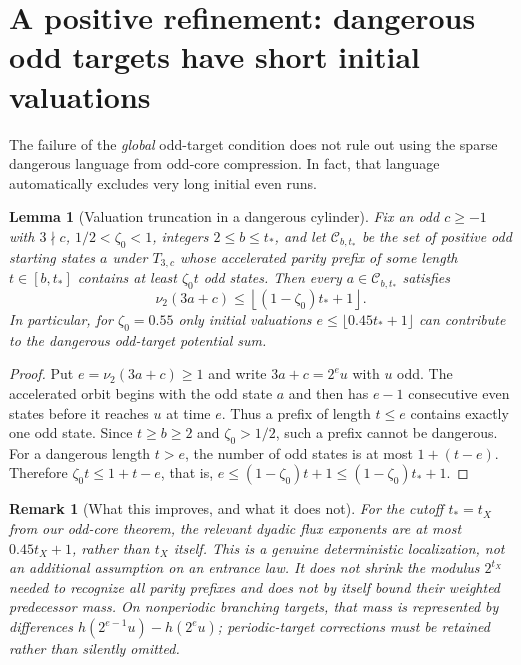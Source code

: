 \documentclass[11pt,a4paper]{article}
\newtheorem{lemma}[theorem]{Lemma}
\newtheorem{remark}[theorem]{Remark}
\begin{document}
\section{A positive refinement: dangerous odd targets have short initial valuations}
The failure of the \emph{global} odd-target condition does not rule out
using the sparse dangerous language from odd-core compression.  In
fact, that language automatically excludes very long initial
even runs.
\begin{lemma}[Valuation truncation in a dangerous cylinder]\label{lem:valuation}
Fix an odd $c\ge-1$ with $3\nmid c$, $1/2<\zeta_0<1$,
integers $2\le b\le t_*$, and let
$\mathcal C_{b,t_*}$ be the set of positive odd starting states $a$
under $T_{3,c}$ whose accelerated parity prefix of some length $t\in[b,t_*]$
contains at least $\zeta_0t$ odd states.  Then every
$a\in\mathcal C_{b,t_*}$ satisfies
\begin{equation}\label{eq:valuationcut}
 \boxed{\nu_2(3a+c)\le\left\lfloor(1-\zeta_0)t_*+1\right\rfloor.}
\end{equation}
In particular, for $\zeta_0=0.55$ only initial valuations
$e\le\lfloor0.45t_*+1\rfloor$ can contribute to the dangerous
odd-target potential sum.
\end{lemma}
\begin{proof}
Put $e=\nu_2(3a+c)\ge1$ and write $3a+c=2^eu$ with $u$ odd.
The accelerated orbit begins with the odd state $a$ and then has
$e-1$ consecutive even states before it reaches $u$ at time $e$.
Thus a prefix of length $t\le e$ contains exactly one odd state.
Since $t\ge b\ge2$ and $\zeta_0>1/2$, such a prefix cannot be
dangerous.  For a dangerous length $t>e$, the number of odd states
is at most $1+(t-e)$.  Therefore
$\zeta_0t\le1+t-e$, that is,
$e\le(1-\zeta_0)t+1\le(1-\zeta_0)t_*+1$.
\end{proof}
\begin{remark}[What this improves, and what it does not]
For the cutoff $t_*=t_X$ from our odd-core theorem, the relevant
\emph{dyadic flux exponents} are at most $0.45t_X+1$, rather than
$t_X$ itself.  This is a genuine deterministic localization,
not an additional assumption on an entrance law.  It does
\emph{not} shrink the modulus $2^{t_X}$ needed to recognize all
parity prefixes and does not by itself bound their weighted
predecessor mass.  On nonperiodic branching targets, that mass is
represented by differences $h(2^{e-1}u)-h(2^eu)$; periodic-target
corrections must be retained rather than silently omitted.
\end{remark}
\end{document}
